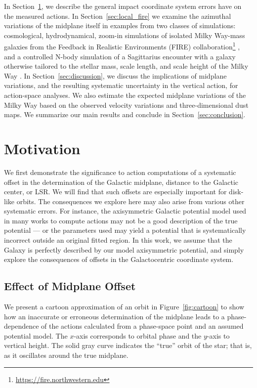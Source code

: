 \documentclass[twocolumn]{aastex62}
\begin{document}
In Section~\ref{sec:ref_frame}, we describe the general impact coordinate system
errors have on the measured actions. In Section~\ref{sec:local_fire} we examine
the azimuthal variations of the midplane itself in examples from two classes of
simulations: cosmological, hydrodynamical, zoom-in simulations of isolated Milky
Way-mass galaxies from the Feedback in Realistic Environments (FIRE)
collaboration\footnote{\url{https://fire.northwestern.edu}}
\citep{2014MNRAS.445..581H, 2016ApJ...827L..23W, 2018MNRAS.480..800H}, and a
controlled N-body simulation of a Sagittarius encounter with a galaxy otherwise
tailored to the stellar mass, scale length, and scale height of the Milky Way
\citep{2018MNRAS.481..286L}. In Section~\ref{sec:discussion}, we discuss the
implications of midplane variations, and the resulting systematic uncertainty in
the vertical action, for action-space analyses. We also estimate the expected
midplane variations of the Milky Way based on the observed velocity variations
and three-dimensional dust maps. We summarize our main results and conclude in
Section~\ref{sec:conclusion}.

\section{Motivation} \label{sec:ref_frame}
We first demonstrate the significance to action computations of a systematic
offset in the determination of the Galactic midplane, distance to the Galactic
center, or LSR. We will find that such offsets are especially important for
disk-like orbits. The consequences we explore here may also arise from various
other systematic errors. For instance, the axisymmetric Galactic potential model
used in many works to compute actions may not be a good description of the true
potential --- or the parameters used may yield a potential that is
systematically incorrect outside an original fitted region. In this work, we
assume that the Galaxy is perfectly described by our model axisymmetric
potential, and simply explore the consequences of offsets in the Galactocentric
coordinate system.

\subsection{Effect of Midplane Offset} \label{ssec:cartoon}
We present a cartoon approximation of an orbit in Figure~\ref{fig:cartoon} to
show how an inaccurate or erroneous determination of the midplane leads to a
phase-dependence of the actions calculated from a phase-space point and an
assumed potential model. The $x$-axis corresponds to orbital phase and the
$y$-axis to vertical height. The solid gray curve indicates the ``true'' orbit
of the star; that is, as it oscillates around the true midplane.
\end{document}
